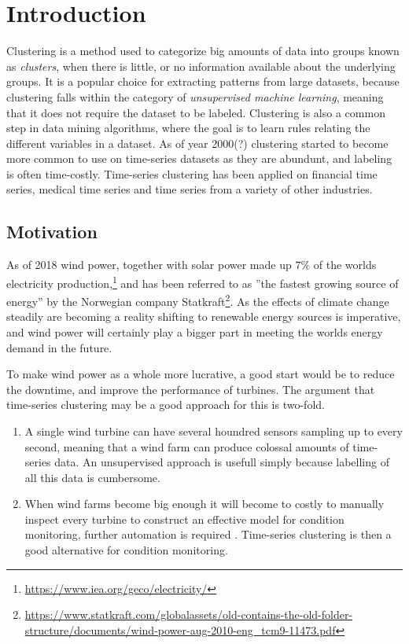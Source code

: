 \chapter{Introduction}

Clustering is a method used to categorize big amounts of data into groups known as \textit{clusters}, when there is little, or no information available about the underlying groups. It is a popular choice for extracting patterns from large datasets, because clustering falls within the category of \textit{unsupervised machine learning}, meaning that it does not require the dataset to be labeled. Clustering is also a common step in data mining algorithms, where the goal is to learn rules relating the different variables in a dataset. As of year 2000(?) clustering started to become more common to use on time-series datasets as they are abundunt, and labeling is often time-costly. Time-series clustering has been applied on financial time series, medical time series and time series from a variety of other industries. \bigskip

\section{Motivation}

As of 2018 wind power, together with solar power made up $7\%$ of the worlds electricity production,\footnote{\url{https://www.iea.org/geco/electricity/}} and has been referred to as ''the fastest growing source of energy'' by the Norwegian company Statkraft\footnote{\url{https://www.statkraft.com/globalassets/old-contains-the-old-folder-structure/documents/wind-power-aug-2010-eng_tcm9-11473.pdf}}. As the effects of climate change steadily are becoming a reality shifting to renewable energy sources is imperative, and wind power will certainly play a bigger part in meeting the worlds energy demand in the future. \bigskip

To make wind power as a whole more lucrative, a good start would be to reduce the downtime, and improve the performance of turbines. The argument that time-series clustering may be a good approach for this is two-fold. 

\begin{enumerate}
    \item A single wind turbine can have several houndred sensors sampling up to every second, meaning that a wind farm can produce colossal amounts of time-series data. An unsupervised approach is usefull simply because labelling of all this data is cumbersome.
    \item When wind farms become big enough it will become to costly to manually inspect every turbine to construct an effective model for condition monitoring, further automation is required \cite{espen}. Time-series clustering is then a good alternative for condition monitoring.
\end{enumerate}

